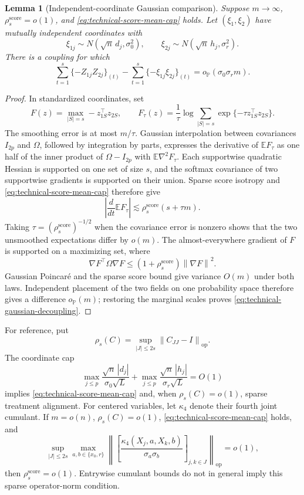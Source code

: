 \documentclass[a4paper,11pt,english]{article}
\newtheorem{lemma}[theorem]{Lemma}
\newcommand{\E}{\mathbb E}
\newcommand{\Prob}{\mathbb P}
\newcommand{\norm}[1]{\left\lVert #1\right\rVert}
\begin{document}
\begin{lemma}[Independent-coordinate Gaussian comparison]
\label{lem:technical-gaussian-decoupling}
Suppose $m\to\infty$, $\rho_s^{\mathrm{score}}=o(1)$, and
\eqref{eq:technical-score-mean-cap} holds.  Let $(\xi_1,\xi_2)$ have
mutually independent coordinates with
\[
 \xi_{1j}\sim N(\sqrt n\,d_j,\sigma_0^2),
 \qquad
 \xi_{2j}\sim N(\sqrt n\,h_j,\sigma_r^2).
\]
There is a coupling for which
\begin{equation}\label{eq:technical-gaussian-decoupling}
 \sum_{t=1}^s\{-Z_{1j}Z_{2j}\}_{(t)}
 -\sum_{t=1}^s\{-\xi_{1j}\xi_{2j}\}_{(t)}
 =o_{\Prob}(\sigma_0\sigma_r m).
\end{equation}
\end{lemma}

\begin{proof}
In standardized coordinates, set
\[
 F(z)=\max_{|S|=s}-z_{1S}^\top z_{2S},
 \qquad
 F_\tau(z)=\frac1\tau
 \log\sum_{|S|=s}\exp\{-\tau z_{1S}^\top z_{2S}\}.
\]
The smoothing error is at most $m/\tau$.  Gaussian interpolation between
covariances $I_{2p}$ and $\Omega$, followed by integration by parts,
expresses the derivative of $\E F_\tau$ as one half of the inner product
of $\Omega-I_{2p}$ with $\E\nabla^2F_\tau$.  Each supportwise quadratic
Hessian is supported on one set of size $s$, and the softmax covariance
of two supportwise gradients is supported on their union.  Sparse score
isotropy and \eqref{eq:technical-score-mean-cap} therefore give
\[
 \left|\frac{d}{dt}\E F_\tau\right|
 \lesssim\rho_s^{\mathrm{score}}(s+\tau m).
\]
Taking $\tau=(\rho_s^{\mathrm{score}})^{-1/2}$ when the covariance error
is nonzero shows that the two unsmoothed expectations differ by $o(m)$.
The almost-everywhere gradient of $F$ is supported on a maximizing set,
where
\[
 \nabla F^\top\Omega\nabla F
 \le(1+\rho_s^{\mathrm{score}})\norm{\nabla F}^2.
\]
Gaussian Poincar\'e and the sparse score bound give variance $O(m)$
under both laws.  Independent placement of the two fields on one
probability space therefore gives a difference
$o_{\Prob}(m)$; restoring the marginal scales proves
\eqref{eq:technical-gaussian-decoupling}.
\end{proof}

For reference, put
\[
 \rho_s(C)=\sup_{|J|\le2s}\norm{C_{JJ}-I}_{\mathrm{op}}.
\]
The coordinate cap
\[
 \max_{j\le p}\frac{\sqrt n\,|d_j|}{\sigma_0\sqrt L}
 +\max_{j\le p}\frac{\sqrt n\,|h_j|}{\sigma_r\sqrt L}=O(1)
\]
implies \eqref{eq:technical-score-mean-cap} and, when
$\rho_s(C)=o(1)$, sparse treatment alignment.  For centered variables,
let $\kappa_4$ denote their fourth joint cumulant.  If $m=o(n)$,
$\rho_s(C)=o(1)$, \eqref{eq:technical-score-mean-cap} holds, and
\[
 \sup_{|J|\le2s}\max_{a,b\in\{x_0,r\}}
 \norm{\left[
 \frac{\kappa_4(X_j,a,X_k,b)}{\sigma_a\sigma_b}
 \right]_{j,k\in J}}_{\mathrm{op}}=o(1),
\]
then $\rho_s^{\mathrm{score}}=o(1)$.  Entrywise cumulant bounds do not in
general imply this sparse operator-norm condition.
\end{document}
